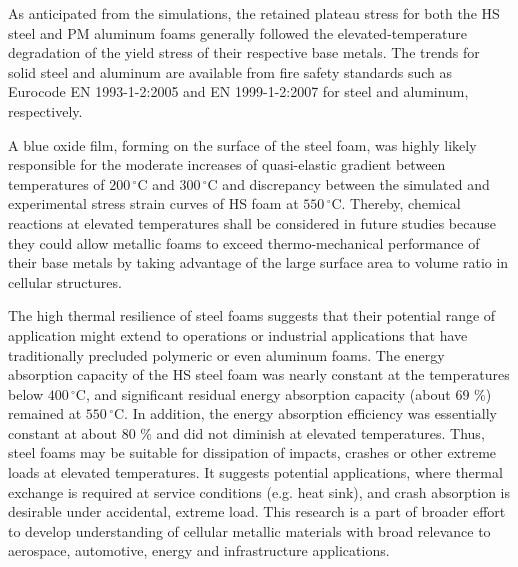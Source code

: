 \documentclass[review]{elsarticle}
\begin{document}
As anticipated from the simulations, the retained plateau stress for both the HS steel and PM aluminum foams generally followed the elevated-temperature degradation of the yield stress of their respective base metals. The trends for solid steel and aluminum are available from fire safety standards such as Eurocode EN 1993-1-2:2005 and EN 1999-1-2:2007 for steel and aluminum, respectively. 

A blue oxide film, forming on the surface of the steel foam, was highly likely responsible for the moderate increases of quasi-elastic gradient between temperatures of $200\,^{\circ}\mathrm{C}$ and $300\,^{\circ}\mathrm{C}$ and discrepancy between the simulated and experimental stress strain curves of HS foam at $550\,^{\circ}\mathrm{C}$.  Thereby, chemical reactions at elevated temperatures shall be considered in future studies because they could allow metallic foams to exceed thermo-mechanical performance of their base metals by taking advantage of the large surface area to volume ratio in cellular structures.

The high thermal resilience of steel foams suggests that their potential range of application might extend to operations or industrial applications that have traditionally precluded polymeric or even aluminum foams. The energy absorption capacity of the HS steel foam was nearly constant at the temperatures below $400\,^{\circ}\mathrm{C}$, and significant residual energy absorption capacity (about 69 \%) remained at $550\,^{\circ}\mathrm{C}$. In addition, the energy absorption efficiency was essentially constant at about 80 \% and did not diminish at elevated temperatures. Thus, steel foams may be suitable for dissipation of impacts, crashes or other extreme loads at elevated temperatures. It suggests potential applications, where thermal exchange is required at service conditions (e.g. heat sink), and crash absorption is desirable under accidental, extreme load. This research is a part of broader effort to develop understanding of cellular metallic materials with broad relevance to aerospace, automotive, energy and infrastructure applications.
\end{document}
